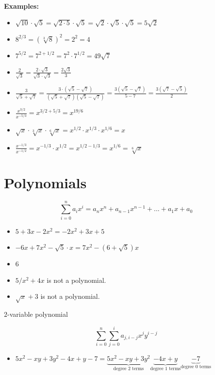 \documentclass{article}
\begin{document}
\textbf{Examples:}
\begin{itemize}
\item \(\sqrt{10} \cdot \sqrt{5} = \sqrt{2 \cdot 5} \cdot \sqrt{5} = \sqrt{2} \cdot \sqrt{5} \cdot \sqrt{5} = 5\sqrt{2}\)
\item \(8^{2/3} = (\sqrt[3]{8})^2 = 2^2 = 4\)
\item \(7^{5/2} = 7^{2 + 1/2} = 7^2 \cdot 7^{1/2} = 49\sqrt{7}\)
\item \(\frac{2}{\sqrt{3}} = \frac{2 \cdot \sqrt{3}}{\sqrt{3} \cdot \sqrt{3}} = \frac{2\sqrt{3}}{3}\)
\item \(\frac{3}{\sqrt{5} + \sqrt{7}} = \frac{3 \cdot (\sqrt{5} - \sqrt{7})}{(\sqrt{5} + \sqrt{7})(\sqrt{5} - \sqrt{7})} = \frac{3(\sqrt{5} - \sqrt{7})}{5 - 7} = \frac{3(\sqrt{7} - \sqrt{5})}{2}\)
\item \(\frac{x^{3/2}}{x^{-5/3}} = x^{3/2 + 5/3} = x^{19/6}\)%
\item \(\sqrt{x} \cdot \sqrt[3]{x} \cdot \sqrt[6]{x} = x^{1/2} \cdot x^{1/3} \cdot x^{1/6} = x\)
\item \(\frac{x^{-1/3}}{x^{-1/2}} = x^{-1/3} \cdot x^{1/2} = x^{1/2 - 1/3} = x^{1/6} = \sqrt[6]{x}\)
\end{itemize}



\section{Polynomials}

\[\sum_{i=0}^n a_i x^i = a_nx^n + a_{n-1}x^{n-1} + ... + a_1x + a_0\]

\begin{itemize}
\item \(5 + 3x - 2x^2 = -2x^2 + 3x + 5\)
\item \(-6x + 7x^2 - \sqrt{5} \cdot x = 7x^2 - (6 + \sqrt{5})x\)
\item \(6\)
\item \(5/x^2 + 4x\) is not a polynomial.
\item \(\sqrt{x} + 3\) is not a polynomial.
\end{itemize}

\(2\)-variable polynomial

\[\sum_{i=0}^n \sum_{j=0}^i a_{j,i-j} x^j y^{i-j}\]

\begin{itemize}
\item \(5x^2 - xy + 3y^2 - 4x + y - 7 = \underbrace{5x^2 - xy + 3y^2}_{\text{degree 2 terms}}\underbrace{ - 4x + y}_{\text{degree 1 terms}}\underbrace{ - 7}_{\text{degree 0 terms}}\)
\end{itemize}
\end{document}
